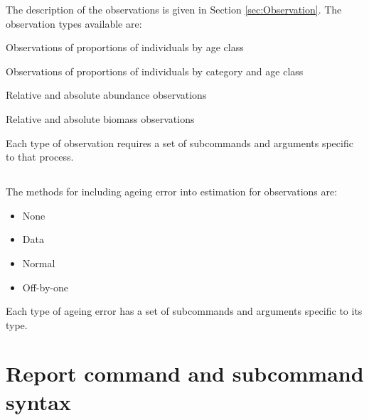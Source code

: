 The description of the observations is given in Section \ref{sec:Observation}. The observation types available are:

\begin{description}
  \item Observations of proportions of individuals by age class
  \item Observations of proportions of individuals by category and age class
  \item Relative and absolute abundance observations
  \item Relative and absolute biomass observations
\end{description}

Each type of observation requires a set of subcommands and arguments specific to that process.



\subsection{}


\subsection{}\label{syntax:AgeingError}

The methods for including ageing error into estimation for observations are:

\begin{itemize}
	\item None
	\item Data
	\item Normal
	\item Off-by-one
\end{itemize}

Each type of ageing error has a set of subcommands and arguments specific to its type.



\subsection{}


\section{Report command and subcommand syntax\label{syntax:Report}}

